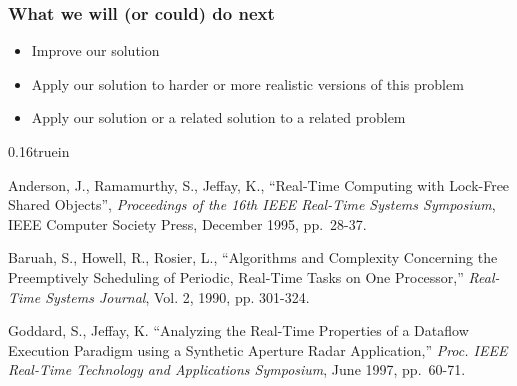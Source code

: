 \documentclass[11pt]{article}
\newcommand{\singlespace}{\baselineskip0.16truein}
\begin{document}
\subsubsection*{What we will (or could) do next}
\begin{itemize}
\item   Improve our solution
\item   Apply our solution to harder or more realistic versions of this problem
\item   Apply our solution or a related solution to a related problem

\end{itemize}





\begin{thebibliography}{99}%
\singlespace

 Anderson, J., Ramamurthy, S., Jeffay, K.,
``Real-Time Computing with Lock-Free Shared Objects''\negthinspace,
{\em Proceedings of the 16th IEEE Real-Time Systems Symposium\/},
IEEE Computer Society Press, December 1995, pp.\ 28-37.

 Baruah, S., Howell, R., Rosier, L.,
``Algorithms and Complexity Concerning the Preemptively Scheduling of Periodic,
Real-Time Tasks on One Processor,'' {\em Real-Time Systems Journal\/},
Vol. 2, 1990, pp. 301-324.


 Goddard, S., Jeffay, K. ``Analyzing the Real-Time Properties of
a Dataflow Execution Paradigm using a Synthetic Aperture Radar Application,''
{\em Proc. IEEE Real-Time Technology and Applications
Symposium\/}, June 1997, pp.\ 60-71.

%

\end{thebibliography}
\end{document}

